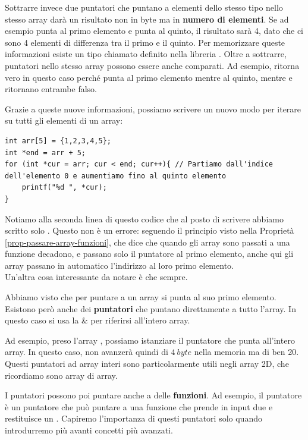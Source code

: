 \documentclass[11pt, a4paper, titlepage, oneside]{scrbook}
\begin{document}
Sottrarre invece due puntatori che puntano a elementi dello stesso tipo nello stesso array darà un risultato non in byte ma in \textbf{numero di elementi}. Se ad esempio  punta al primo elemento e  punta al quinto, il risultato sarà 4, dato che ci sono 4 elementi di differenza tra il primo e il quinto. Per memorizzare queste informazioni esiste un tipo chiamato  definito nella libreria . Oltre a sottrarre, puntatori nello stesso array possono essere anche comparati. Ad esempio,  ritorna vero in questo caso perché  punta al primo elemento mentre  al quinto, mentre  e  ritornano entrambe falso. 

Grazie a queste nuove informazioni, possiamo scrivere un nuovo modo per iterare su tutti gli elementi di un array:
\begin{lstlisting}[style=C]
int arr[5] = {1,2,3,4,5};
int *end = arr + 5;
for (int *cur = arr; cur < end; cur++){ // Partiamo dall'indice dell'elemento 0 e aumentiamo fino al quinto elemento
    printf("%d ", *cur);
}
\end{lstlisting}

Notiamo alla seconda linea di questo codice che al posto di scrivere  abbiamo scritto solo . Questo non è un errore: seguendo il principio visto nella Proprietà \ref{prop-passare-array-funzioni}, che dice che quando gli array sono passati a una funzione decadono, e passano solo il puntatore al primo elemento, anche qui gli array passano in automatico l'indirizzo al loro primo elemento. \\
Un'altra cosa interessante da notare è che  sempre.

\begin{Definizione}
\label{def-puntatore-array}
Abbiamo visto che per puntare a un array si punta al suo primo elemento. Esistono però anche dei \textbf{puntatori} che puntano direttamente a tutto l'array. In questo caso si usa la \& per riferirsi all'intero array.
\end{Definizione}
Ad esempio, preso l'array , possiamo istanziare il puntatore  che punta all'intero array. In questo caso,  non avanzerà quindi di $\SI{4}{byte}$ nella memoria ma di ben 20. Questi puntatori ad array interi sono particolarmente utili negli array 2D, che ricordiamo sono array di array. 

I puntatori possono poi puntare anche a delle \textbf{funzioni}. Ad esempio, il puntatore  è un puntatore che può puntare a una funzione che prende in input due  e restituisce un . Capiremo l'importanza di questi puntatori solo quando introdurremo più avanti concetti più avanzati.
\end{document}
